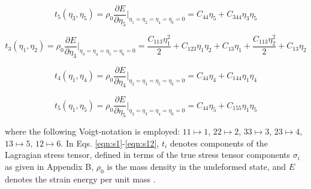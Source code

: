 \documentclass[showpacs,aps,floatfix,prb,reprint,superscriptaddress]{revtex4-1}
\begin{document}
\begin{equation}
\label{eqn:s9} 
t_{5} \left(\eta_{3}, \eta_{5}\right) = \rho_{0} \frac{\partial E}{\partial \eta_{5}}\Bigr|_{\eta_1=\eta_2=\eta_4=\eta_6=0} = C_{44}\eta_{5} + C_{344}\eta_{3}\eta_{5}
\end{equation}

\begin{equation}
\label{eqn:s10} 
t_{3} \left(\eta_{1}, \eta_{2}\right) = \rho_{0} \frac{\partial E}{\partial \eta_{3}}\Bigr|_{\eta_3=\eta_4=\eta_5=\eta_6=0} = \frac{C_{113}\eta_{1}^2}{2} + C_{123}\eta_{1}\eta_{2} + C_{13}\eta_{1} +  \frac{C_{113}\eta_{2}^2}{2} + C_{13}\eta_{2}
\end{equation}

\begin{equation}
\label{eqn:s11} 
t_{4} \left(\eta_{1}, \eta_{4}\right) = \rho_{0} \frac{\partial E}{\partial \eta_{4}}\Bigr|_{\eta_2=\eta_3=\eta_5=\eta_6=0} = C_{44}\eta_{4} + C_{144}\eta_{1}\eta_{4}
\end{equation}

\begin{equation}
\label{eqn:s12} 
t_{5} \left(\eta_{1}, \eta_{5}\right) = \rho_{0} \frac{\partial E}{\partial \eta_{5}}\Bigr|_{\eta_2=\eta_3=\eta_4=\eta_6=0} = C_{44}\eta_{5} + C_{155}\eta_{1}\eta_{5}
\end{equation}

\twocolumngrid


where the following Voigt-notation is employed: $11 \mapsto 1$, $22 \mapsto 2$, $33 \mapsto 3$, $23 \mapsto 4$, $13 \mapsto 5$, $12 \mapsto 6$.  In Eqs. \ref{eqn:s1}-\ref{eqn:s12}, $t_{i}$ denotes components of the Lagragian stress tensor, defined in terms of the true stress tensor components $\sigma_{i}$ as given in Appendix B, $\rho_0$ is the mass density in the undeformed state, and $E$ denotes the strain energy per unit mass \cite{lopuszynski2007ab}.
\end{document}
